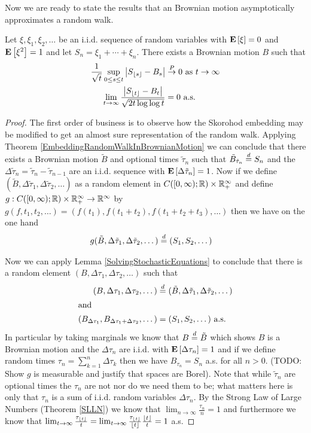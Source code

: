 Now we are ready to state the results that an Brownian motion
asymptotically approximates a random walk.
\begin{thm}\label{RandomWalkApproximatesBrownianMotion}Let $\xi, \xi_1, \xi_2, \dotsc$ be an i.i.d. sequence of
  random variables with $\textbf{E}\left[\xi\right] = 0$ and
  $\textbf{E}\left[\xi^2\right] = 1$ and let $S_n = \xi_1 + \dotsb + \xi_n$.  There exists a Brownian motion $B$ such
  that 
\begin{align*}
\frac{1}{\sqrt{t}}\sup_{0 \leq s \leq t} \left \vert S_{\left \lfloor s \right \rfloor} - B_s \right \vert
&\overset{P}\to 0 \text{ as $t \to \infty$} \\
\lim_{t \to \infty} \frac{\left \vert S_{\left \lfloor t \right \rfloor} - B_t \right \vert}{\sqrt{2t\log \log
    t}} &= 0 \text { a.s.}
\end{align*}
\end{thm}
\begin{proof}
The first order of business is to observe how the Skorohod embedding
may be modified to get an almost sure representation of the random
walk.  Applying Theorem \ref{EmbeddingRandomWalkInBrownianMotion} we
can conclude that there exists a Brownian motion $\tilde{B}$ and
optional times $\tilde{\tau}_n$ such that $\tilde{B}_{\tilde{\tau}_n}
\overset{d}= S_n$ and the $\Delta \tilde{\tau}_n = \tilde{\tau}_n - \tilde{\tau}_{n-1}$ are an
i.i.d. sequence with $\textbf{E}\left[\Delta \tilde{\tau}_n\right] = 1$.  Now
if we define $(\tilde{B}, \Delta \tilde{\tau}_1, \Delta
\tilde{\tau}_2, \dotsc)$ as a random element in $C([0,\infty);\mathbb{R})
\times \mathbb{R}_+^\infty$ and define $g : C([0,\infty);\mathbb{R})
\times \mathbb{R}_+^\infty \to \mathbb{R}^\infty$ by $g(f, t_1, t_2, \dotsc) =
(f(t_1), f(t_1 + t_2) , f(t_1 + t_2 + t_3), \dotsc)$ then we have on
the one hand 
\begin{align*}
g(\tilde{B}, \Delta \tilde{\tau}_1, \Delta
\tilde{\tau}_2, \dotsc) &\overset{d}= (S_1, S_2, \dotsc)
\end{align*}

Now we can
apply Lemma \ref{SolvingStochasticEquations} to conclude that there is
a random element $(B, \Delta \tau_1, \Delta \tau_2, \dotsc)$ such that 
\begin{align*}
(B, \Delta \tau_1, \Delta \tau_2, \dotsc) &\overset{d}= 
(\tilde{B}, \Delta \tilde{\tau}_1, \Delta \tilde{\tau}_2, \dotsc) \\
\intertext{and}
(B_{\Delta \tau_1}, B_{\Delta \tau_1 + \Delta \tau_2}, \dotsc) 
&= (S_1,S_2, \dotsc) \text{ a.s.}
\end{align*}  
In particular by taking marginals we know that $B \overset{d}=
\tilde{B}$ which shows $B$ is a Brownian motion and the $\Delta
\tau_n$ are i.i.d. with $\textbf{E}\left[\Delta \tau_n\right] = 1$ and  if we
define random times $\tau_n = \sum_{k=1}^n \Delta \tau_k$ then we have
$B_{\tau_n} = S_n$ a.s. for all $n>0$.
(TODO: Show $g$ is measurable and justify that spaces are Borel).
Note that while $\tilde{\tau}_n$ are optional times the $\tau_n$ are not nor do
we need them to be; what matters here is only that $\tau_n$ is a sum
of i.i.d. random variables $\Delta \tau_n$.  By the Strong Law of Large Numbers (Theorem
\ref{SLLN}) we know that $\lim_{n \to \infty} \frac{\tau_n}{n} = 1$
and furthermore we know that 
$\lim_{t \to \infty} \frac{\tau_{\left \lfloor t \right \rfloor}}{t} = \lim_{t \to \infty}
\frac{\tau_{\left \lfloor t \right \rfloor}}{\left \lfloor t \right \rfloor}\frac{\left \lfloor t \right \rfloor}{t} = 1$ a.s.


\end{proof}
